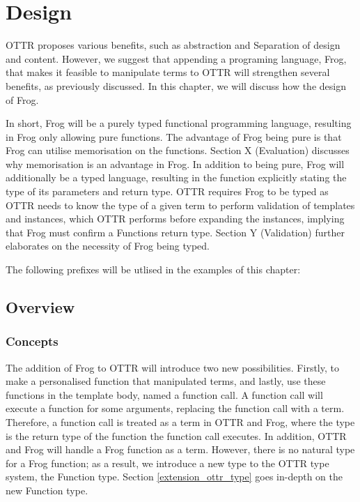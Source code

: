 
\chapter{Design} %
OTTR proposes various benefits, such as abstraction and Separation of design and content. However, we suggest that appending a programing language, Frog, that makes it feasible to manipulate terms to OTTR will strengthen several benefits, as previously discussed.  In this chapter, we will discuss how the design of Frog.

\para 
In short, Frog will be a purely typed functional programming language, resulting in Frog only allowing pure functions. The advantage of Frog being pure is that Frog can utilise memorisation on the functions. Section X (Evaluation) discusses why memorisation is an advantage in Frog. In addition to being pure, Frog will additionally be a typed language, resulting in the function explicitly stating the type of its parameters and return type. OTTR requires Frog to be typed as OTTR needs to know the type of a given term to perform validation of templates and instances, which OTTR performs before expanding the instances, implying that Frog must confirm a Functions return type. Section Y (Validation) further elaborates on the necessity of Frog being typed. 

\para
The following prefixes will be utlised in the examples of this chapter:


\section{Overview}

\subsection{Concepts}
\label{concepts}
The addition of Frog to OTTR will introduce two new possibilities. Firstly, to make a personalised function that manipulated terms, and lastly, use these functions in the template body, named a function call. A function call will execute a function for some arguments, replacing the function call with a term. Therefore, a function call is treated as a term in OTTR and Frog, where the type is the return type of the function the function call executes. In addition, OTTR and Frog will handle a Frog function as a term. However, there is no natural type for a Frog function; as a result, we introduce a new type to the OTTR type system, the Function type. Section \ref{extension_ottr_type} goes in-depth on the new Function type. 

